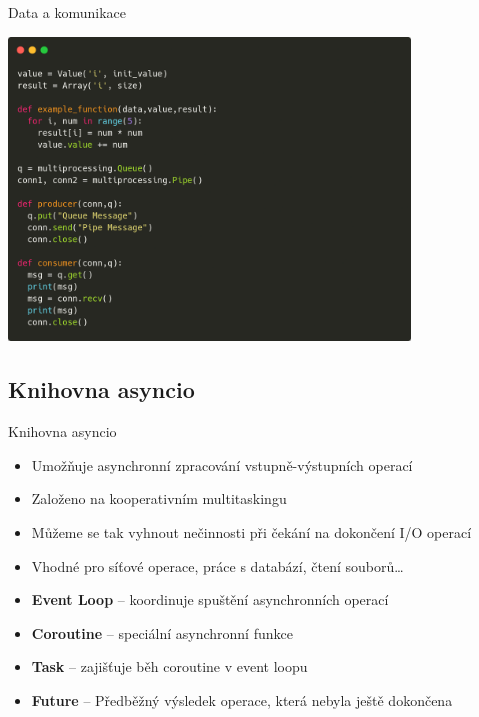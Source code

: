 \documentclass{beamer}
\begin{document}
\begin{frame}[fragile]{Data a komunikace}
    \scriptsize
    \begin{center}
        \includegraphics[width=0.8\textwidth]{obrazky/codes/carbon8.png}
    \end{center}
\end{frame}

\subsection{Knihovna asyncio}
\begin{frame}{Knihovna asyncio}
    \begin{itemize}
        \item Umožňuje asynchronní zpracování vstupně-výstupních operací
        \item Založeno na kooperativním multitaskingu
        \item Můžeme se tak vyhnout nečinnosti při čekání na dokončení I/O operací
        \item Vhodné pro síťové operace, práce s databází, čtení souborů…
        
        \vskip 0.35in
        \item \textbf{Event Loop} – koordinuje spuštění asynchronních operací
        \item \textbf{Coroutine} – speciální asynchronní funkce
        \item \textbf{Task} – zajišťuje běh coroutine v event loopu
        \item \textbf{Future} – Předběžný výsledek operace, která nebyla ještě dokončena
    \end{itemize}
\end{frame}
\end{document}

